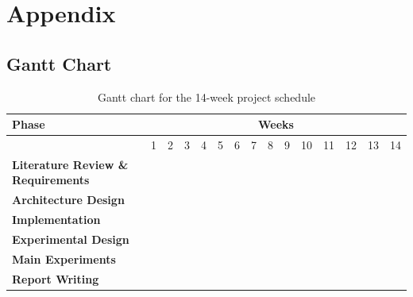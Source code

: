 \documentclass[12pt]{article}
\begin{document}
\section*{Appendix}
\appendix
\subsection{Gantt Chart} \label{app:gantt}
\begin{table}[h!]
\centering
\small
\setlength{\tabcolsep}{3pt}
\renewcommand{\arraystretch}{1.7}

\newcommand{\ganttcell}{\cellcolor{gray!40}}

\begin{tabular}{|p{10cm}|*{14}{c|}}
\hline
\textbf{Phase} & \multicolumn{14}{c|}{\textbf{Weeks}} \\ \hline
 & 1 & 2 & 3 & 4 & 5 & 6 & 7 & 8 & 9 & 10 & 11 & 12 & 13 & 14 \\ \hline
\textbf{Literature Review \& Requirements}
  & \ganttcell & \ganttcell & \ganttcell & \ganttcell &  &  &  &  &  &  &  &  &  &  \\ \hline
\textbf{Architecture Design}
  &  &  &  &  & \ganttcell & \ganttcell &  &  &  &  &  &  &  &  \\ \hline
\textbf{Implementation}
  &  &  &  &  &  &  & \ganttcell & \ganttcell & \ganttcell &  &  &  &  &  \\ \hline
\textbf{Experimental Design}
  &  &  &  &  &  &  &  &  &  & \ganttcell &  &  &  &  \\ \hline
\textbf{Main Experiments}
  &  &  &  &  &  &  &  &  &  &  & \ganttcell & \ganttcell &  &  \\ \hline
\textbf{Report Writing}
  &  &  &  &  &  &  &  &  &  &  &  &  & \ganttcell & \ganttcell \\ \hline
\end{tabular}
\caption{Gantt chart for the 14-week project schedule}
\label{tab:gantt}
\end{table}
\end{document}
